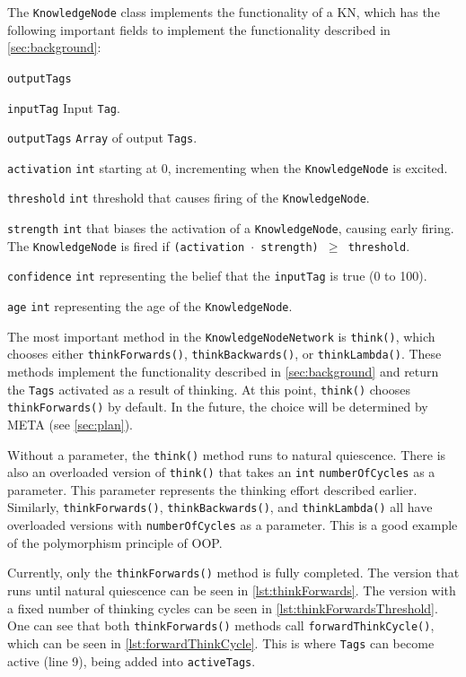 \documentclass[titlepage,11pt]{article}
\newcommand{\ar}[1]{\autoref{#1}}
\newcommand{\code}[1]{\texttt{#1}}
\begin{document}
The \code{KnowledgeNode} class implements the functionality of a KN, which has the following important fields to implement the functionality described in \autoref{sec:background}:

\begin{labeling}{\code{outputTags}}
	\item[\code{inputTag}] Input \code{Tag}.
	\item[\code{outputTags}] \code{Array} of output \code{Tags}.
	\item[\code{activation}] \code{int} starting at 0, incrementing when the \code{KnowledgeNode} is excited.
	\item[\code{threshold}] \code{int} threshold that causes firing of the \code{KnowledgeNode}.
	\item[\code{strength}] \code{int} that biases the activation of a \code{KnowledgeNode}, causing early firing. The \code{KnowledgeNode} is fired if \code{(activation $\cdot$ strength) $\geq$ threshold}.
	\item[\code{confidence}] \code{int} representing the belief that the \code{inputTag} is true (0 to 100).
	\item[\code{age}] \code{int} representing the age of the \code{KnowledgeNode}.
\end{labeling}

The most important method in the \code{KnowledgeNodeNetwork} is \code{think()}, which chooses either \code{thinkForwards()}, \code{thinkBackwards()}, or \code{thinkLambda()}. These methods implement the functionality described in \ar{sec:background} and return the \code{Tags} activated as a result of thinking. At this point, \code{think()} chooses \code{thinkForwards()} by default. In the future, the choice will be determined by META (see \autoref{sec:plan}).

Without a parameter, the \code{think()} method runs to natural quiescence. There is also an overloaded version of \code{think()} that takes an \code{int} \code{numberOfCycles} as a parameter. This parameter represents the thinking effort described earlier. Similarly, \code{thinkForwards()}, \code{thinkBackwards()}, and \code{thinkLambda()} all have overloaded versions with \code{numberOfCycles} as a parameter. This is a good example of the polymorphism principle of OOP.


Currently, only the \code{thinkForwards()} method is fully completed. The version that runs until natural quiescence can be seen in \autoref{lst:thinkForwards}. The version with a fixed number of thinking cycles can be seen in \autoref{lst:thinkForwardsThreshold}. One can see that both \code{thinkForwards()} methods call \code{forwardThinkCycle()}, which can be seen in \autoref{lst:forwardThinkCycle}. This is where \code{Tags} can become active (line 9), being added into \code{activeTags}.
\end{document}

